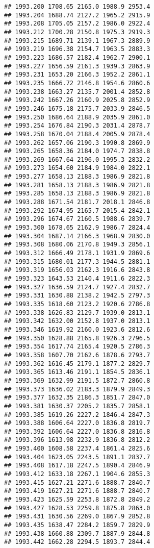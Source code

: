 \documentclass[
]{article}
\begin{document}
\begin{verbatim}
## 1993.200 1708.65 2165.0 1988.9 2953.4
## 1993.204 1688.74 2127.2 1965.2 2915.9
## 1993.208 1705.05 2157.2 1986.0 2922.4
## 1993.212 1700.28 2150.8 1975.3 2919.3
## 1993.215 1689.71 2139.1 1967.3 2889.9
## 1993.219 1696.38 2154.7 1963.5 2883.3
## 1993.223 1686.57 2182.4 1962.7 2900.1
## 1993.227 1656.59 2161.3 1939.3 2863.9
## 1993.231 1653.20 2166.3 1952.2 2861.1
## 1993.235 1666.72 2146.8 1954.6 2860.6
## 1993.238 1663.27 2135.7 2001.4 2852.8
## 1993.242 1667.26 2160.9 2025.8 2852.9
## 1993.246 1675.18 2175.7 2033.9 2846.5
## 1993.250 1686.64 2188.9 2035.9 2861.0
## 1993.254 1676.84 2190.3 2031.4 2878.7
## 1993.258 1670.04 2188.4 2005.9 2878.4
## 1993.262 1657.06 2190.3 1990.8 2869.9
## 1993.265 1658.36 2184.0 1974.7 2838.8
## 1993.269 1667.64 2196.0 1995.3 2832.2
## 1993.273 1654.60 2184.9 1984.0 2822.1
## 1993.277 1658.13 2188.3 1986.9 2821.8
## 1993.281 1658.13 2188.3 1986.9 2821.8
## 1993.285 1658.13 2188.3 1986.9 2821.8
## 1993.288 1671.54 2181.7 2018.1 2846.8
## 1993.292 1674.95 2165.7 2015.4 2842.1
## 1993.296 1674.67 2160.5 1988.6 2839.7
## 1993.300 1678.65 2162.9 1986.7 2824.4
## 1993.304 1687.14 2166.3 1968.9 2830.0
## 1993.308 1680.06 2170.8 1949.3 2856.1
## 1993.312 1666.49 2178.1 1931.9 2869.6
## 1993.315 1680.01 2177.3 1944.5 2881.1
## 1993.319 1656.03 2162.3 1916.6 2843.8
## 1993.323 1643.53 2140.4 1911.6 2822.3
## 1993.327 1636.59 2124.7 1927.4 2832.7
## 1993.331 1630.88 2138.2 1942.5 2797.3
## 1993.335 1618.60 2123.2 1920.6 2786.8
## 1993.338 1626.83 2129.7 1939.0 2813.1
## 1993.342 1632.00 2152.8 1937.0 2813.1
## 1993.346 1619.92 2160.0 1923.6 2812.6
## 1993.350 1628.88 2165.8 1926.3 2796.5
## 1993.354 1617.74 2165.4 1920.5 2786.3
## 1993.358 1607.70 2162.6 1878.6 2793.7
## 1993.362 1616.45 2179.1 1877.2 2829.7
## 1993.365 1613.46 2191.1 1854.5 2836.1
## 1993.369 1632.99 2191.5 1872.7 2860.8
## 1993.373 1636.02 2183.3 1879.9 2849.3
## 1993.377 1632.35 2186.3 1851.7 2847.0
## 1993.381 1630.37 2205.2 1835.7 2858.1
## 1993.385 1619.26 2227.2 1846.4 2847.3
## 1993.388 1606.64 2227.0 1836.8 2819.7
## 1993.392 1606.64 2227.0 1836.8 2816.8
## 1993.396 1613.98 2232.9 1836.8 2812.2
## 1993.400 1608.58 2237.4 1861.4 2825.6
## 1993.404 1623.05 2243.5 1891.1 2837.7
## 1993.408 1617.18 2247.5 1890.4 2846.9
## 1993.412 1633.18 2267.1 1904.6 2855.3
## 1993.415 1627.21 2271.6 1888.7 2840.7
## 1993.419 1627.21 2271.6 1888.7 2840.7
## 1993.423 1625.59 2253.8 1872.8 2849.2
## 1993.427 1628.53 2259.8 1875.8 2863.0
## 1993.431 1630.56 2269.0 1867.9 2852.8
## 1993.435 1638.47 2284.2 1859.7 2829.9
## 1993.438 1660.88 2309.7 1887.9 2844.8
## 1993.442 1662.28 2294.5 1893.7 2844.4

\end{verbatim}
\end{document}
